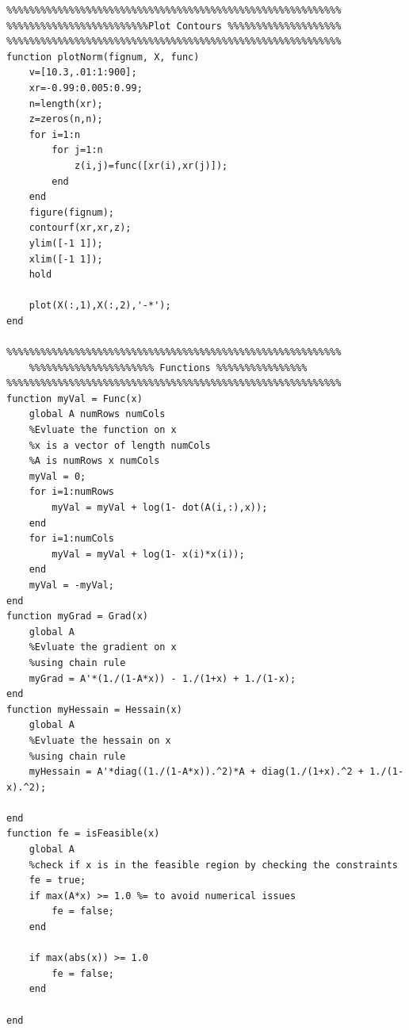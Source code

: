 \documentclass[12pt] {article}
\begin{document}
\begin{lstlisting}
%%%%%%%%%%%%%%%%%%%%%%%%%%%%%%%%%%%%%%%%%%%%%%%%%%%%%%%%%%%
%%%%%%%%%%%%%%%%%%%%%%%%%Plot Contours %%%%%%%%%%%%%%%%%%%%
%%%%%%%%%%%%%%%%%%%%%%%%%%%%%%%%%%%%%%%%%%%%%%%%%%%%%%%%%%%
function plotNorm(fignum, X, func)
    v=[10.3,.01:1:900];
    xr=-0.99:0.005:0.99;
    n=length(xr);
    z=zeros(n,n);
    for i=1:n
        for j=1:n        
            z(i,j)=func([xr(i),xr(j)]);
        end
    end
    figure(fignum);
    contourf(xr,xr,z);
    ylim([-1 1]);
    xlim([-1 1]);
    hold 
    
    plot(X(:,1),X(:,2),'-*');
end

%%%%%%%%%%%%%%%%%%%%%%%%%%%%%%%%%%%%%%%%%%%%%%%%%%%%%%%%%%%
    %%%%%%%%%%%%%%%%%%%%%% Functions %%%%%%%%%%%%%%%%
%%%%%%%%%%%%%%%%%%%%%%%%%%%%%%%%%%%%%%%%%%%%%%%%%%%%%%%%%%%
function myVal = Func(x)
    global A numRows numCols
    %Evluate the function on x
    %x is a vector of length numCols 
    %A is numRows x numCols
    myVal = 0;
    for i=1:numRows
        myVal = myVal + log(1- dot(A(i,:),x));
    end
    for i=1:numCols
        myVal = myVal + log(1- x(i)*x(i));
    end    
    myVal = -myVal;
end
function myGrad = Grad(x)
    global A
    %Evluate the gradient on x    
    %using chain rule
    myGrad = A'*(1./(1-A*x)) - 1./(1+x) + 1./(1-x);
end
function myHessain = Hessain(x)
    global A    
    %Evluate the hessain on x    
    %using chain rule
    myHessain = A'*diag((1./(1-A*x)).^2)*A + diag(1./(1+x).^2 + 1./(1-x).^2); 
    
end
function fe = isFeasible(x)
    global A    
    %check if x is in the feasible region by checking the constraints 
    fe = true;
    if max(A*x) >= 1.0 %= to avoid numerical issues 
        fe = false;
    end
    
    if max(abs(x)) >= 1.0 
        fe = false;
    end

end
\end{lstlisting}

\end{document}
